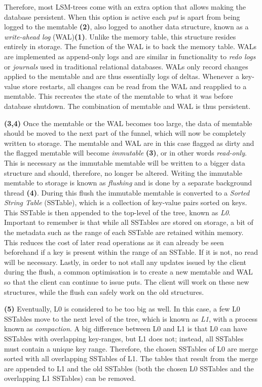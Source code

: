 Therefore, most LSM-trees come with an extra option that allows making the database persistent. When this option is active each \textit{put} is apart from being logged to the memtable \textbf{(2)}, also logged to another data structure, known as a \textit{write-ahead log} (WAL)\textbf{(1)}. Unlike the memory table, this structure resides entirely in storage. The function of the WAL is to back the memory table. WALs are implemented as append-only logs and are similar in functionality to \textit{redo logs} or \textit{journals} used in traditional relational databases. WALs only record changes applied to the memtable and are thus essentially logs of deltas. Whenever a key-value store restarts, all changes can be read from the WAL and reapplied to a memtable. This recreates the state of the memtable to what it was before database shutdown. The combination of memtable and WAL is thus persistent. 

\textbf{(3,4)} Once the memtable or the WAL becomes too large, the data of memtable should be moved to the next part of the funnel, which will now be completely written to storage. The memtable and WAL are in this case flagged as dirty and the flagged memtable will become \textit{immutable} \textbf{(3)}, or in other words \textit{read-only}. This is necessary as the immutable memtable will be written to a bigger data structure and should, therefore, no longer be altered. Writing the immutable memtable to storage is known as \textit{flushing} and is done by a separate background thread \textbf{(4)}. During this flush the immutable memtable is converted to a \textit{Sorted String Table} (SSTable), which is a collection of key-value pairs sorted on keys. This SSTable is then appended to the top-level of the tree, known as \textit{L0}. Important to remember is that while all SSTables are stored on storage, a bit of the metadata such as the range of each SSTable are retained within memory. This reduces the cost of later read operations as it can already be seen beforehand if a key is present within the range of an SSTable. If it is not, no read will be necessary. Lastly, in order to not stall any updates issued by the client during the flush, a common optimisation is to create a new memtable and WAL so that the client can continue to issue puts. The client will work on these new structures, while the flush can safely work on the old structures.

\textbf{(5)} Eventually, L0 is considered to be too big as well. In this case, a few L0 SSTables move to the next level of the tree, which is known as \textit{L1}, with a process known as \textit{compaction}. A big difference between L0 and L1 is that L0 can have SSTables with overlapping key-ranges, but L1 does not; instead, all SSTables must contain a unique key range. Therefore, the chosen SSTables of L0 are merge sorted with all overlapping SSTables of L1. The tables that result from the merge are appended to L1 and the old SSTables (both the chosen L0 SSTables and the overlapping L1 SSTables) can be removed.

